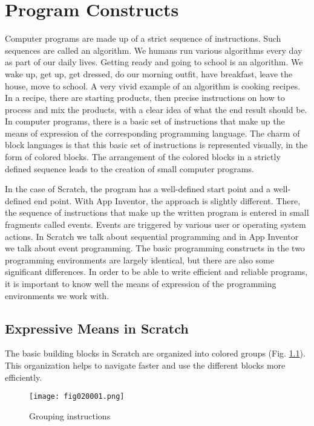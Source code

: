 \chapter{Program Constructs}

Computer programs are made up of a strict sequence of instructions. Such sequences are called an algorithm. We humans run various algorithms every day as part of our daily lives. Getting ready and going to school is an algorithm. We wake up, get up, get dressed, do our morning outfit, have breakfast, leave the house, move to school. A very vivid example of an algorithm is cooking recipes. In a recipe, there are starting products, then precise instructions on how to process and mix the products, with a clear idea of what the end result should be. In computer programs, there is a basic set of instructions that make up the means of expression of the corresponding programming language. The charm of block languages is that this basic set of instructions is represented visually, in the form of colored blocks. The arrangement of the colored blocks in a strictly defined sequence leads to the creation of small computer programs.

In the case of Scratch, the program has a well-defined start point and a well-defined end point. With App Inventor, the approach is slightly different. There, the sequence of instructions that make up the written program is entered in small fragments called events. Events are triggered by various user or operating system actions. In Scratch we talk about sequential programming and in App Inventor we talk about event programming. The basic programming constructs in the two programming environments are largely identical, but there are also some significant differences. In order to be able to write efficient and reliable programs, it is important to know well the means of expression of the programming environments we work with.

\section{Expressive Means in Scratch}

The basic building blocks in Scratch are organized into colored groups (Fig. \ref{fig020001}). This organization helps to navigate faster and use the different blocks more efficiently.

\begin{figure}[H]
   \centering
   \texttt{[image: fig020001.png]}
   \caption{Grouping instructions}
\label{fig020001}
\end{figure}

